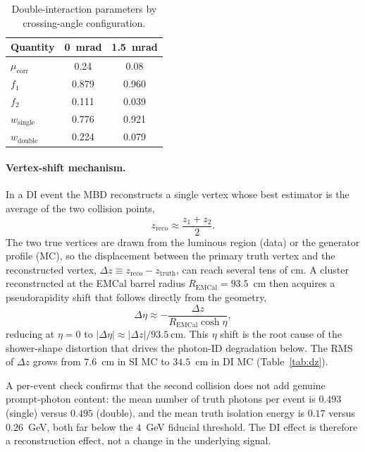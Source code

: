 \documentclass[11pt]{article}
\begin{document}
\begin{table}[h]
\centering
\caption{Double-interaction parameters by crossing-angle configuration.}
\label{tab:di}
\begin{tabular}{lcc}
\toprule
Quantity & 0~mrad & 1.5~mrad \\
\midrule
$\mu_{\mathrm{corr}}$ & 0.24 & 0.08 \\
$f_1$       & 0.879 & 0.960 \\
$f_2$       & 0.111 & 0.039 \\
$w_{\mathrm{single}}$ & 0.776 & 0.921 \\
$w_{\mathrm{double}}$ & 0.224 & 0.079 \\
\bottomrule
\end{tabular}
\end{table}

\paragraph{Vertex-shift mechanism.} In a DI event the MBD reconstructs a single
vertex whose best estimator is the average of the two collision points,
\begin{equation}
  z_{\mathrm{reco}} \approx \frac{z_1 + z_2}{2}.
\end{equation}
The two true vertices are drawn from the luminous region (data) or the generator
profile (MC), so the displacement between the primary truth vertex and the
reconstructed vertex, $\Delta z\equiv z_{\mathrm{reco}}-z_{\mathrm{truth}}$, can
reach several tens of cm. A cluster reconstructed at the EMCal barrel radius
$R_{\mathrm{EMCal}}=93.5$~cm then acquires a pseudorapidity shift that follows
directly from the geometry,
\begin{equation}
  \Delta\eta \approx -\frac{\Delta z}{R_{\mathrm{EMCal}}\cosh\eta},
\end{equation}
reducing at $\eta=0$ to $|\Delta\eta|\approx|\Delta z|/93.5~\mathrm{cm}$. This
$\eta$ shift is the root cause of the shower-shape distortion that drives the
photon-ID degradation below. The RMS of $\Delta z$ grows from $7.6$~cm in SI MC to
$34.5$~cm in DI MC (Table~\ref{tab:dz}).

A per-event check confirms that the second collision does not add genuine
prompt-photon content: the mean number of truth photons per event is $0.493$
(single) versus $0.495$ (double), and the mean truth isolation energy is
$0.17$ versus $0.26$~GeV, both far below the $4$~GeV fiducial threshold. The DI
effect is therefore a reconstruction effect, not a change in the underlying
signal.
\end{document}
